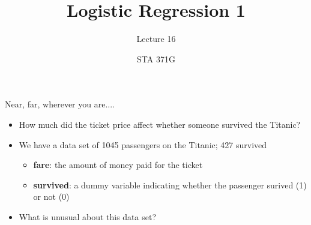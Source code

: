 \documentclass{beamer}\usepackage[]{graphicx}\usepackage[]{color}
\title{Logistic Regression 1}
\subtitle{Lecture 16}
\author{STA 371G}
\makeatletter
\newcommand{\hlopt}[1]{\textcolor[rgb]{1,0.894,0.769}{#1}}%
\newcommand{\hlstd}[1]{\textcolor[rgb]{1,0.894,0.769}{#1}}%
\newcommand{\hlkwb}[1]{\textcolor[rgb]{0.804,0.776,0.451}{#1}}%
\newcommand{\hlkwc}[1]{\textcolor[rgb]{0.78,0.941,0.545}{#1}}%
\newcommand{\hlkwd}[1]{\textcolor[rgb]{1,0.78,0.769}{#1}}%
\newenvironment{kframe}{%
 \def\at@end@of@kframe{}%
 \ifinner\ifhmode%
  \def\at@end@of@kframe{\end{minipage}}%
  \begin{minipage}{\columnwidth}%
 \fi\fi%
 \def\FrameCommand##1{\hskip\@totalleftmargin \hskip-\fboxsep
 \colorbox{shadecolor}{##1}\hskip-\fboxsep
     \hskip-\linewidth \hskip-\@totalleftmargin \hskip\columnwidth}%
 \MakeFramed {\advance\hsize-\width
   \@totalleftmargin\z@ \linewidth\hsize
   \@setminipage}}%
 {\par\unskip\endMakeFramed%
 \at@end@of@kframe}
\newenvironment{knitrout}{}{} %
\makeatother
\begin{document}
  
  

  \frame{\maketitle}



  \begin{darkframes}
    \begin{frame}{Near, far, wherever you are....}
      \begin{itemize}
        \item How much did the ticket price affect whether someone survived the Titanic?
        \item We have a data set of 1045 passengers on the Titanic; 427 survived
          \begin{itemize}
            \item \textbf{fare}: the amount of money paid for the ticket
            \item \textbf{survived}: a dummy variable indicating whether the passenger surived (1) or not (0)
          \end{itemize}
        \pause
        \item What is unusual about this data set?
      \end{itemize}
    \end{frame}



\end{darkframes}
\end{document}
